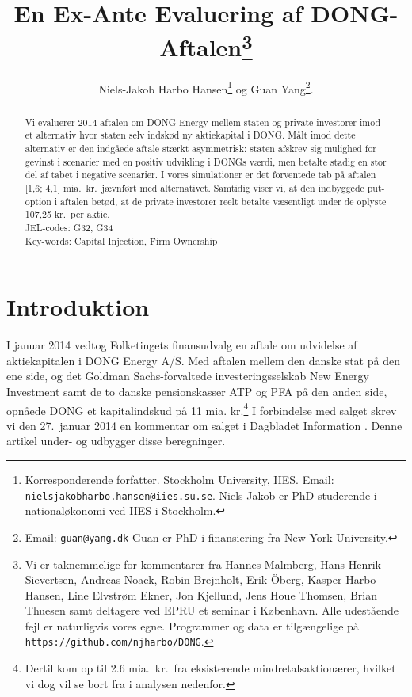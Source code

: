 \documentclass{article}
\title{En Ex-Ante Evaluering af DONG-Aftalen\thanks{Vi er taknemmelige for kommentarer fra Hannes Malmberg, Hans Henrik Sievertsen, Andreas Noack, Robin Brejnholt, Erik {\"O}berg, Kasper Harbo Hansen, Line Elvstrøm Ekner, Jon Kjellund,  Jens Houe Thomsen, Brian Thuesen samt deltagere ved EPRU et seminar i København. Alle udestående fejl er naturligvis vores egne.  Programmer og data er tilgængelige på \texttt{https://github.com/njharbo/DONG}.} \\ }
\author{Niels-Jakob Harbo Hansen\thanks{Korresponderende forfatter. Stockholm University, IIES.  Email: \texttt{nielsjakobharbo.hansen@iies.su.se}. Niels-Jakob er PhD studerende i nationaløkonomi ved IIES i Stockholm.} \hspace{0.1 mm} og Guan Yang\thanks{Email: \texttt{guan@yang.dk} Guan er PhD i finansiering fra New York University.  }. }
\begin{document}
\maketitle

\begin{abstract}
\onehalfspacing
 Vi evaluerer 2014-aftalen om DONG Energy mellem staten og private investorer imod et alternativ hvor staten selv indskød ny aktiekapital i DONG. Målt imod dette alternativ er den indgåede aftale stærkt asymmetrisk: staten afskrev sig mulighed for gevinst i scenarier med en positiv udvikling i DONGs værdi, men betalte stadig en stor del af tabet i negative scenarier. I vores simulationer er det forventede tab på aftalen [1,6; 4,1] mia.\ kr.\ jævnført med alternativet. Samtidig viser vi, at den indbyggede put-option i aftalen betød, at de private investorer reelt betalte væsentligt under de oplyste 107,25 kr.\ per aktie. \\
 JEL-codes: G32, G34 \\
 Key-words: Capital Injection, Firm Ownership
\end{abstract}


\newpage

\section{Introduktion}


I januar 2014 vedtog Folketingets finansudvalg en aftale om udvidelse af aktiekapitalen i DONG Energy A/S. Med aftalen mellem den danske stat på den ene side, og det Goldman Sachs-forvaltede investeringsselskab New Energy Investment samt de to danske pensionskasser ATP og PFA på den anden side, opnåede DONG et kapitalindskud på 11 mia. kr.\footnote{Dertil kom op til 2.6 mia.\ kr.\ fra eksisterende mindretalsaktionærer, hvilket vi dog vil se bort fra i analysen nedenfor.} I forbindelse med salget skrev vi den 27.\ januar 2014 en kommentar om salget i Dagbladet Information \citep{Hansen2014}. Denne artikel under- og udbygger disse beregninger.
\end{document}
